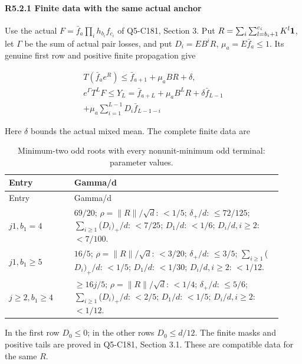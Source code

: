 \paragraph{R5.2.1 Finite data with the same actual anchor}

Use the actual \(F=\bar f_a\prod_i h_{b_i}f_{c_i}\) of Q5-C181, Section 3. Put \(R=\sum_i\sum_{l=b_i+1}^{c_i}K^l\mathbf1\), let \(\Gamma\) be the sum of actual pair losses, and put \(D_i=EB^iR\), \(\mu_a=E\bar f_a\le1\). Its genuine first row and positive finite propagation give

\[
\begin{gathered}
T(\bar f_a e^R)\le \bar f_{a+1}+\mu_a BR+\delta,\\
e^\Gamma T^LF\le Y_L=\bar f_{a+L}+\mu_a B^LR+\delta \bar f_{L-1}\\
+\mu_a \sum_{i=1}^{L-1}D_i \bar f_{L-1-i} 
\end{gathered}\tag{R5.2.1}
\]

Here \(\delta\) bounds the actual mixed mean. The complete finite data are


\begingroup\small
\setlength{\tabcolsep}{3pt}
\setlength{\LTleft}{0pt}\setlength{\LTright}{\fill}
\begin{longtable}{@{}p{0.2200\linewidth}p{0.7000\linewidth}@{}}
\caption{Minimum-two odd roots with every nonunit-minimum odd terminal: parameter values.}\label{tab:parameters:r2-c005:1}\\
\toprule
Entry & Gamma/d \\
\midrule\endfirsthead
\toprule
Entry & Gamma/d \\
\midrule\endhead
\bottomrule\endfoot
\(j1,\allowbreak b_1=4\) & \(69/20\); \(\rho=\|R\|/\sqrt{d}\): \(<1/5\); \(\delta_+/d\): \(\le 72/125\); \(\sum_{i\ge 1}\)(\(D_i)_+/d\): \(<7/25\); \(D_1/d\): \(<1/6\); \(D_i/d,\allowbreak  i\ge 2\): \(<7/100\). \\
\addlinespace[2pt]
\(j1,\allowbreak b_1\ge 5\) & \(16/5\); \(\rho=\|R\|/\sqrt{d}\): \(<3/20\); \(\delta_+/d\): \(\le 3/5\); \(\sum_{i\ge 1}\)(\(D_i)_+/d\): \(<1/5\); \(D_1/d\): \(<1/30\); \(D_i/d,\allowbreak  i\ge 2\): \(<1/12\). \\
\addlinespace[2pt]
\(j\ge 2,\allowbreak b_1\ge 4\) & \(\ge 16j/5\); \(\rho=\|R\|/\sqrt{d}\): \(<1/4\); \(\delta_+/d\): \(\le 5/6\); \(\sum_{i\ge 1}\)(\(D_i)_+/d\): \(<2/5\); \(D_1/d\): \(<1/5\); \(D_i/d,\allowbreak  i\ge 2\): \(<1/12\). \\
\end{longtable}
\endgroup


In the first row \(D_0\le0\); in the other rows \(D_0\le d/12\). The finite masks and positive tails are proved in Q5-C181, Section 3.1. These are compatible data for the same \(R\).

